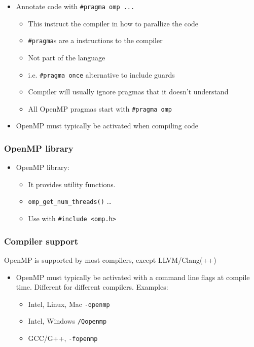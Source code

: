 \begin{itemize}
\itemsep1pt\parskip0pt
\item
  Annotate code with \texttt{\#pragma omp ...}

  \begin{itemize}
  \itemsep1pt\parskip0pt
  \item
    This instruct the compiler in how to parallize the code
  \item
    \texttt{\#pragma}s are a instructions to the compiler
  \item
    Not part of the language
  \item
    i.e. \texttt{\#pragma once} alternative to include guards
  \item
    Compiler will usually ignore pragmas that it doesn't understand
  \item
    All OpenMP pragmas start with \texttt{\#pragma omp}
  \end{itemize}
\item
  OpenMP must typically be activated when compiling code
\end{itemize}

\subsubsection{OpenMP library}\label{openmp-library}

\begin{itemize}
\itemsep1pt\parskip0pt
\item
  OpenMP library:

  \begin{itemize}
  \itemsep1pt\parskip0pt
  \item
    It provides utility functions.
  \item
    \texttt{omp\_get\_num\_threads()} \ldots{}
  \item
    Use with \texttt{\#include \textless{}omp.h\textgreater{}}
  \end{itemize}
\end{itemize}

\subsubsection{Compiler support}\label{compiler-support}

OpenMP is supported by most compilers, except LLVM/Clang(++)

\begin{itemize}
\itemsep1pt\parskip0pt
\item
  OpenMP must typically be activated with a command line flags at
  compile time. Different for different compilers. Examples:

  \begin{itemize}
  \itemsep1pt\parskip0pt
  \item
    Intel, Linux, Mac \texttt{-openmp}
  \item
    Intel, Windows \texttt{/Qopenmp}
  \item
    GCC/G++, \texttt{-fopenmp}
  \end{itemize}
\end{itemize}

